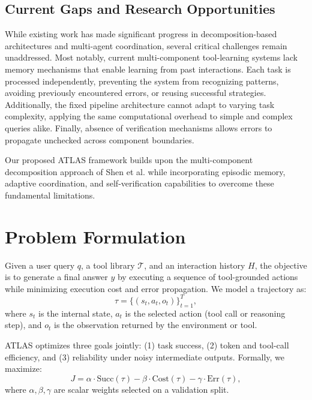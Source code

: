 \documentclass[conference]{IEEEtran}
\begin{document}
\subsection{Current Gaps and Research Opportunities}

While existing work has made significant progress in decomposition-based architectures and multi-agent coordination, several critical challenges remain unaddressed. Most notably, current multi-component tool-learning systems lack memory mechanisms that enable learning from past interactions. Each task is processed independently, preventing the system from recognizing patterns, avoiding previously encountered errors, or reusing successful strategies. Additionally, the fixed pipeline architecture cannot adapt to varying task complexity, applying the same computational overhead to simple and complex queries alike. Finally, absence of verification mechanisms allows errors to propagate unchecked across component boundaries.

Our proposed ATLAS framework builds upon the multi-component decomposition approach of Shen et al. \cite{shen2024small} while incorporating episodic memory, adaptive coordination, and self-verification capabilities to overcome these fundamental limitations.

\section{Problem Formulation}

Given a user query $q$, a tool library $\mathcal{T}$, and an interaction history $H$, the objective is to generate a final answer $y$ by executing a sequence of tool-grounded actions while minimizing execution cost and error propagation. We model a trajectory as:
\begin{equation}
\tau = \{(s_t, a_t, o_t)\}_{t=1}^{T},
\end{equation}
where $s_t$ is the internal state, $a_t$ is the selected action (tool call or reasoning step), and $o_t$ is the observation returned by the environment or tool.

ATLAS optimizes three goals jointly: (1) task success, (2) token and tool-call efficiency, and (3) reliability under noisy intermediate outputs. Formally, we maximize:
\begin{equation}
J = \alpha \cdot \text{Succ}(\tau) - \beta \cdot \text{Cost}(\tau) - \gamma \cdot \text{Err}(\tau),
\end{equation}
where $\alpha,\beta,\gamma$ are scalar weights selected on a validation split.
\end{document}
